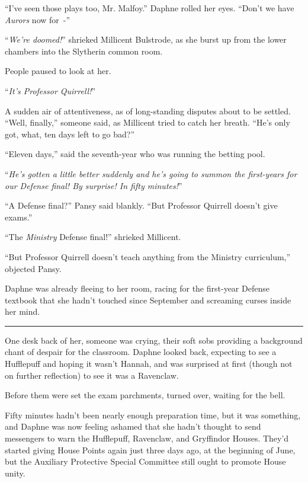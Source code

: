 ``I've seen those plays too, Mr. Malfoy.'' Daphne rolled her eyes. ``Don't we have \emph{Aurors} now for~-''

``\emph{We're doomed!}'' shrieked Millicent Bulstrode, as she burst up from the lower chambers into the Slytherin common room.

People paused to look at her.

``\emph{It's Professor Quirrell!}''

A sudden air of attentiveness, as of long-standing disputes about to be settled. ``Well, finally,'' someone said, as Millicent tried to catch her breath. ``He's only got, what, ten days left to go bad?''

``Eleven days,'' said the seventh-year who was running the betting pool.

``\emph{He's gotten a little better suddenly and he's going to summon the first-years for our Defense final! By surprise! In fifty minutes!}''

``A Defense final?'' Pansy said blankly. ``But Professor Quirrell doesn't give exams.''

``The \emph{Ministry} Defense final!'' shrieked Millicent.

``But Professor Quirrell doesn't teach anything from the Ministry curriculum,'' objected Pansy.

Daphne was already fleeing to her room, racing for the first-year Defense textbook that she hadn't touched since September and screaming curses inside her mind.

\begin{center}\rule{3in}{0.4pt}\end{center}

One desk back of her, someone was crying, their soft sobs providing a background chant of despair for the classroom. Daphne looked back, expecting to see a Hufflepuff and hoping it wasn't Hannah, and was surprised at first (though not on further reflection) to see it was a Ravenclaw.

Before them were set the exam parchments, turned over, waiting for the bell.

Fifty minutes hadn't been nearly enough preparation time, but it was something, and Daphne was now feeling ashamed that she hadn't thought to send messengers to warn the Hufflepuff, Ravenclaw, and Gryffindor Houses. They'd started giving House Points again just three days ago, at the beginning of June, but the Auxiliary Protective Special Committee still ought to promote House unity.

